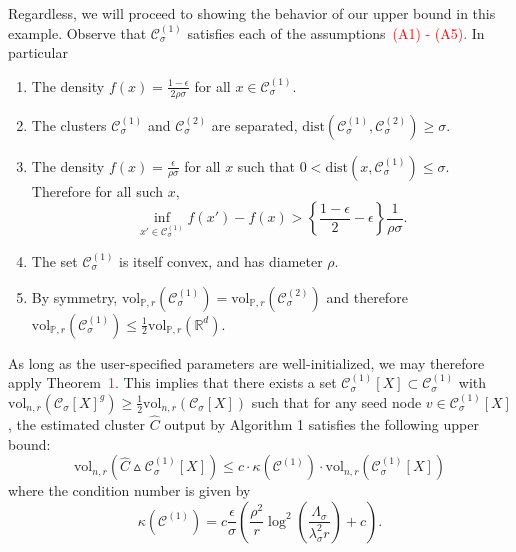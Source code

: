 \documentclass[11pt,twoside]{article}
\newcommand{\vol}{\mathrm{vol}}
\newcommand{\Reals}{\mathbb{R}}
\newcommand{\1}{\mathbf{1}}
\newcommand{\dist}{\mathrm{dist}}
\newcommand{\Xbf}{X}             %
\newcommand{\Pbb}{\mathbb{P}}
\newcommand{\Cset}{\mathcal{C}}
\newcommand{\Csig}{\Cset_{\sigma}}
\begin{document}
Regardless, we will proceed to showing the behavior of our upper bound in this example. Observe that $\Csig^{(1)}$ satisfies each of the assumptions~\textcolor{red}{(A1) - (A5).} In particular
\begin{enumerate}[label=(A\arabic*)]
	\item The density $f(x) = \frac{1 - \epsilon}{2 \rho \sigma}$ for all $x \in \Csig^{(1)}$.
	\item The clusters $\Csig^{(1)}$ and $\Csig^{(2)}$ are separated, $\dist(\Csig^{(1)}, \Csig^{(2)}) \geq \sigma$. 
	\item The density $f(x) = \frac{\epsilon}{\rho\sigma}$ for all $x$ such that $0 < \dist(x,\Csig^{(1)}) \leq \sigma$. Therefore for all such $x$,
	\begin{equation*}
	\inf_{x' \in \Csig^{(1)}} f(x') - f(x)  > \left\{\frac{1 - \epsilon}{2} - \epsilon \right\} \frac{1}{\rho \sigma}.
	\end{equation*}
	\item The set $\Csig^{(1)}$ is itself convex, and has diameter $\rho$.
	\item By symmetry, $\vol_{\Pbb,r}(\Csig^{(1)}) = \vol_{\Pbb,r}(\Csig^{(2)})$ and therefore $\vol_{\Pbb,r}(\Csig^{(1)}) \leq \frac{1}{2}\vol_{\Pbb,r}(\Reals^d)$. 
\end{enumerate}
As long as the user-specified parameters are well-initialized, we may therefore apply Theorem~\textcolor{red}{1}. This implies that there exists a set $\Csig^{(1)}[\Xbf] \subset \Csig^{(1)}$ with $\vol_{n,r}(\Csig[\Xbf]^g) \geq \frac{1}{2}\vol_{n,r}(\Csig[\Xbf])$ such that for any seed node $v \in \Csig^{(1)}[\Xbf]$, the estimated cluster $\widehat{C}$ output by Algorithm 1 satisfies the following upper bound:
\begin{equation*}
\vol_{n,r}(\widehat{C} \vartriangle \Csig^{(1)}[\Xbf]) \leq c \cdot \kappa(\Cset^{(1)}) \cdot \vol_{n,r}(\Csig^{(1)}[\Xbf])
\end{equation*}
where the condition number is given by
\begin{equation*}
\kappa(\Cset^{(1)}) = c \frac{\epsilon}{\sigma}\left(\frac{\rho^2}{r}\log^2\left(\frac{\Lambda_{\sigma}}{\lambda_{\sigma}^2r}\right) + c\right).
\end{equation*}
\end{document}
